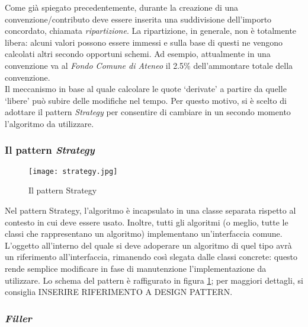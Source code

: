 Come già spiegato precedentemente, durante la creazione di una convenzione/contributo deve essere inserita una suddivisione dell'importo concordato, chiamata \textsl{ripartizione}. La ripartizione, in generale, non è totalmente libera: alcuni valori possono essere immessi e sulla base di questi ne vengono calcolati altri secondo opportuni schemi. Ad esempio, attualmente in una convenzione va al \textsl{Fondo Comune di Ateneo} il 2.5\% dell'ammontare totale della convenzione. \\
Il meccanismo in base al quale calcolare le quote \textquoteleft derivate\textquoteright{} a partire da quelle \textquoteleft libere\textquoteright{} può subire delle modifiche nel tempo. Per questo motivo, si è scelto di adottare il pattern \textsl{Strategy} per consentire di cambiare in un secondo momento l'algoritmo da utilizzare.\\

\subsubsection{Il pattern \textsl{Strategy}}

\begin{figure}
\centering
\texttt{[image: strategy.jpg]}
\caption{Il pattern Strategy}
\label{strategy}
\end{figure}


Nel pattern Strategy, l'algoritmo è incapsulato in una classe separata rispetto al contesto in cui deve essere usato. Inoltre, tutti gli algoritmi (o meglio, tutte le classi che rappresentano un algoritmo) implementano un'interfaccia comune. L'oggetto all'interno del quale si deve adoperare un algoritmo di quel tipo avrà un riferimento all'interfaccia, rimanendo così slegata dalle classi concrete: questo rende semplice modificare in fase di manutenzione l'implementazione da utilizzare. Lo schema del pattern è raffigurato in figura \ref{strategy}; per maggiori dettagli, si consiglia INSERIRE RIFERIMENTO A DESIGN PATTERN.\\

\subsubsection{\textsl{Filler}}

